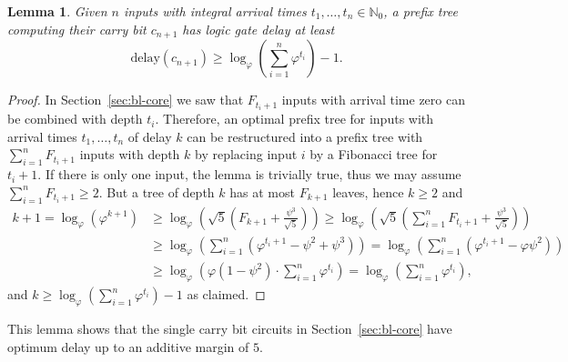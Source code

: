 \documentclass[11pt,final,microtype]{scrartcl}
\theoremstyle{plain}
\newtheorem{lemma}[theorem]{Lemma}
\theoremstyle{definition}
\theoremstyle{remark}
\newcommand{\loq}{\log_{\varphi}}
\newcommand{\delay}{\mathrm{delay}}
\begin{document}
\begin{lemma}\label{lem:bl-lb}
  Given $n$ inputs with integral arrival times $t_1, \dots, t_n\in
  \mathbb{N}_0$, a prefix tree computing their carry bit $c_{n+1}$ has
  logic gate delay at least
  $$\delay(c_{n+1}) \geq \loq \left(\sum_{i=1}^n \varphi^{t_i}\right) - 1.$$
\end{lemma}
\begin{proof}
  In Section~\ref{sec:bl-core} we saw that $F_{t_i+1}$ inputs with
  arrival time zero can be combined with depth $t_i$. Therefore, an
  optimal prefix tree for inputs with arrival times $t_1, \dots, t_n$
  of delay $k$ can be restructured into a prefix tree with
  $\sum_{i=1}^n F_{t_i+1}$ inputs with depth $k$ by replacing input
  $i$ by a Fibonacci tree for $t_i + 1$. If there is only one input,
  the lemma is trivially true, thus we may assume $\sum_{i=1}^n
  F_{t_i+1}\geq 2$. But a tree of depth $k$ has at most $F_{k+1}$
  leaves, hence $k \geq 2$ and
\begin{align*}
k+1 = \loq \left(\varphi^{k+1}\right) 
    &\geq \loq \left(\sqrt{5} \left(F_{k+1} +
      \frac{\psi^3}{\sqrt{5}}\right)\right)
    \geq \loq \left(\sqrt{5} \left(\sum_{i=1}^n F_{t_i+1} +
      \frac{\psi^3}{\sqrt{5}}\right)\right)\\
    &\geq \loq \left(\sum_{i=1}^n \left(\varphi^{t_i+1} - 
       \psi^2 + \psi^3 \right)\right)
    = \loq \left(\sum_{i=1}^n \left(\varphi^{t_i+1} - 
       \varphi\psi^2 \right)\right)\\
    &\geq \loq \left(\varphi(1 - \psi^2) \cdot \sum_{i=1}^n \varphi^{t_i} \right)
    = \loq \left(\sum_{i=1}^n \varphi^{t_i} \right),
\end{align*}
and $k \geq \loq \left(\sum_{i=1}^n \varphi^{t_i} \right) - 1$ as
claimed. 
\end{proof}
This lemma shows that  the  single carry bit circuits in Section~\ref{sec:bl-core} 
have  optimum delay up to an additive margin of $5$.


\end{document}
